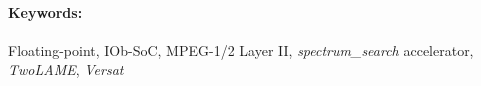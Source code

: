 \paragraph{\hspace{0.5cm} \Large{Keywords:}} Floating-point, IOb-SoC, MPEG-1/2 Layer II, \textit{spectrum\_search} accelerator, \textit{TwoLAME}, \textit{Versat}